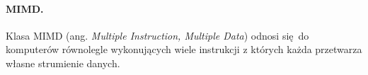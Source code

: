 \paragraph{MIMD.}
Klasa MIMD  (ang. \emph{Multiple Instruction, Multiple Data})
odnosi się do komputerów równolegle wykonujących wiele instrukcji z których każda przetwarza własne strumienie danych.



%
%
%
%
